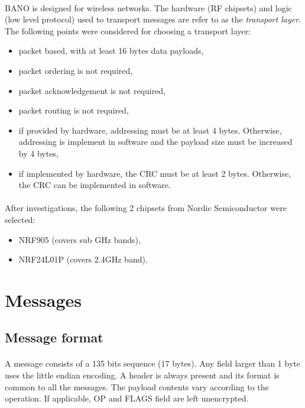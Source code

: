 \documentclass[a4paper, 11pt]{article}
\begin{document}
\paragraph{}
BANO is designed for wireless networks. The hardware (RF chipsets) and logic
(low level protocol) used to transport messages are refer to as the
\textit{transport layer}. The following points were considered for choosing
a transport layer:
\begin{itemize}
\item packet based, with at least 16 bytes data payloads,
\item packet ordering is not required,
\item packet acknowledgement is not required,
\item packet routing is not required,
\item if provided by hardware, addressing must be at least 4 bytes. Otherwise,
addressing is implement in software and the payload size must be increased by 4
bytes,
\item if implemented by hardware, the CRC must be at least 2 bytes. Otherwise,
the CRC can be implemented in software.
\end{itemize}

\paragraph{}
After investigations, the following 2 chipsets from Nordic Semiconductor were
selected:
\begin{itemize}
\item NRF905 (covers sub GHz bands),
\item NRF24L01P (covers 2.4GHz band).
\end{itemize}


\clearpage
\section{Messages}

\subsection{Message format}

\paragraph{}
A message consists of a 135 bits sequence (17 bytes). Any field larger than 1
byte uses the little endian encoding. A header is always present and its format
is common to all the messages. The payload contents vary according to the operation.
If applicable, OP and FLAGS field are left unencrypted.
\end{document}

